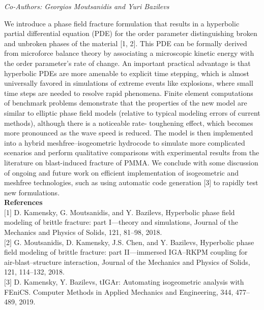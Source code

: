 \begin{center}
\textit{Co-Authors: Georgios Moutsanidis and Yuri Bazilevs}
\end{center} 
We introduce a phase field fracture formulation that results in a hyperbolic partial differential
equation (PDE) for the order parameter distinguishing broken and unbroken phases of the
material [1, 2]. This PDE can be formally derived from microforce balance theory by associating
a microscopic kinetic energy with the order parameter’s rate of change. An important practical
advantage is that hyperbolic PDEs are more amenable to explicit time stepping, which is almost
universally favored in simulations of extreme events like explosions, where small time steps
are needed to resolve rapid phenomena. Finite element computations of benchmark problems
demonstrate that the properties of the new model are similar to elliptic phase field models
(relative to typical modeling errors of current methods), although there is a noticeable rate-
toughening effect, which becomes more pronounced as the wave speed is reduced. The model is
then implemented into a hybrid meshfree–isogeometric hydrocode to simulate more complicated
scenarios and perform qualitative comparisons with experimental results from the literature on
blast-induced fracture of PMMA. We conclude with some discussion of ongoing and future work
on efficient implementation of isogeometric and meshfree technologies, such as using automatic
code generation [3] to rapidly test new formulations.\\

\noindent\textbf{References}\\
$[$1$]$ D. Kamensky, G. Moutsanidis, and Y. Bazilevs, Hyperbolic phase field modeling of brittle
fracture: part I—theory and simulations, Journal of the Mechanics and Physics of Solids,
121, 81–98, 2018.\\\newline
$[$2$]$ G. Moutsanidis, D. Kamensky, J.S. Chen, and Y. Bazilevs, Hyperbolic phase field modeling of brittle fracture: part II—immersed IGA–RKPM coupling for air-blast–structure
interaction, Journal of the Mechanics and Physics of Solids, 121, 114–132, 2018.\\\newline
$[$3$]$ D. Kamensky, Y. Bazilevs, tIGAr: Automating isogeometric analysis with FEniCS. Computer Methods in Applied Mechanics and Engineering, 344, 477–489, 2019.
